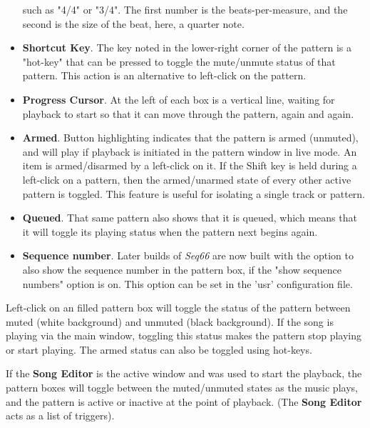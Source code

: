 \begin{itemize}
         such as "4/4" or "3/4".  The first number is the beats-per-measure,
         and the second is the size of the beat, here, a quarter note.
      \item \textbf{Shortcut Key}.
         The key noted in the lower-right corner of the pattern is a "hot-key"
         that can be pressed to toggle the mute/unmute status of that pattern.
         This action is an alternative to left-click on the pattern.
      \item \textbf{Progress Cursor}.
         At the left of each box is a vertical line, waiting for playback to
         start so that it can move through the pattern, again and again.
      \item \textbf{Armed}.
         Button highlighting indicates that the pattern is armed
         (unmuted), and will play if playback is initiated in the pattern
         window in live mode.
         An item is armed/disarmed by a left-click on it.
         If the Shift key is held during a left-click on a pattern, then
         the armed/unarmed state of every other active pattern is toggled.
         This feature is useful for isolating a single track or pattern.
      \item \textbf{Queued}.
         That same pattern also shows that it is queued, which means that it
         will toggle its playing status when the pattern next begins again.
      \item \textbf{Sequence number}.
         Later builds of \textsl{Seq66} are now built with the option to
         also show the sequence number in the pattern box, if the "show
         sequence numbers" option is on.
         This option can be set in the 'usr' configuration file.
   \end{itemize}

   Left-click on an filled pattern box will toggle the status of the
   pattern between muted (white background) and unmuted (black background).
   If the song is playing via the main window, toggling this status makes
   the pattern stop playing or start playing.  The armed status
   can also be toggled using hot-keys.

   If the \textbf{Song Editor} is the active window and was used to
   start the playback, the pattern boxes will toggle between the muted/unmuted
   states as the music plays, and the pattern is active or inactive at the
   point of playback.  (The \textbf{Song Editor} acts as a list of triggers).

